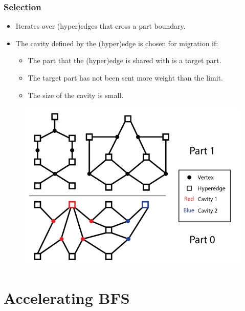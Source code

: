 \documentclass{beamer}
\begin{document}
\begin{frame}
  \frametitle{Selection}
  \begin{minipage}{.5\textwidth}
    \begin{itemize}
    \item Iterates over (hyper)edges that cross a part boundary.
      
    \item The cavity defined by the (hyper)edge is chosen for migration if:
      \begin{itemize}
      \item The part that the (hyper)edge is shared with is a target part.
      \item The target part has not been sent more weight than the limit.
      \item The size of the cavity is small.
      \end{itemize}
    \end{itemize}
  \end{minipage}
  \begin{minipage}{.45\textwidth}

    \begin{figure}
      \centering
      \includegraphics[width=\textwidth]{figures/PartBoundary.png}
    \end{figure}
  \end{minipage}
\end{frame}

\section{Accelerating BFS}
\end{document}
